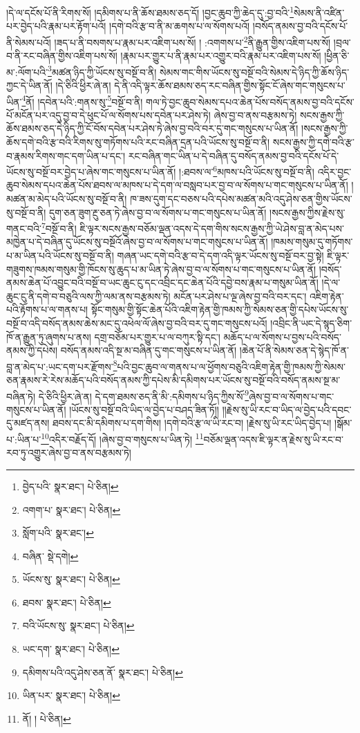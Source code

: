 །དེ་ལ་དངོས་པོ་ནི་རིགས་སོ། །དམིགས་པ་ནི་ཆོས་ཐམས་ཅད་དོ། །བྱང་ཆུབ་ཀྱི་ཆེད་དུ་:བྱ་བའི་\footnote{བྱེད་པའི་  སྣར་ཐང་།  པེ་ཅིན། }སེམས་ནི་འཛིན་པར་བྱེད་པའི་རྣམ་པར་རྟོག་པའོ། །དགེ་བའི་རྩ་བ་ནི་མ་ཆགས་པ་ལ་སོགས་པའོ། །བསོད་ནམས་བྱ་བའི་དངོས་པོ་ནི་སེམས་པའོ། །ཟད་པ་ནི་བསགས་པ་རྣམ་པར་འཇིག་པས་སོ། །
:འགགས་པ་\footnote{འགག་པ་  སྣར་ཐང་།  པེ་ཅིན། }ནི་རྒྱུན་གྱིས་འཇིག་པས་སོ། །བྲལ་བ་ནི་རང་བཞིན་གྱིས་འཇིག་པས་སོ། །རྣམ་པར་གྱུར་པ་ནི་རྣམ་པར་འགྱུར་བའི་རྣམ་པར་འཇིག་པས་སོ། །ཕྱིན་ཅི་མ་:ལོག་པའི་\footnote{སློག་པའི་  སྣར་ཐང་། }མཚན་ཉིད་ཀྱི་ཡོངས་སུ་བསྔོ་བ་ནི། སེམས་གང་གིས་ཡོངས་སུ་བསྔོ་བའི་སེམས་དེ་ཉིད་ཀྱི་ཆོས་ཉིད་ཀྱང་དེ་ཡིན་ནོ། །དེ་ཅིའི་ཕྱིར་ཞེ་ན། དེ་ནི་འདི་ལྟར་ཆོས་ཐམས་ཅད་རང་བཞིན་གྱིས་སྟོང་ངོ་ཞེས་གང་གསུངས་པ་ཡིན་\footnote{བཞིན་  སྡེ་དགེ། }ནོ། །དབེན་པའི་:གནས་སུ་\footnote{ཡོངས་སུ་  སྣར་ཐང་།  པེ་ཅིན། }བསྔོ་བ་ནི། གལ་ཏེ་བྱང་ཆུབ་སེམས་དཔའ་ཆེན་པོས་བསོད་ནམས་བྱ་བའི་དངོས་པོ་མངོན་པར་འདུ་བྱ་བ་དེ་ཕུང་པོ་ལ་སོགས་པས་དབེན་པར་ཤེས་ཏེ། ཞེས་བྱ་བ་ནས་བརྩམས་ཏེ། སངས་རྒྱས་ཀྱི་ཆོས་ཐམས་ཅད་དེ་ཉིད་ཀྱི་ངོ་བོས་དབེན་པར་ཤེས་ཏེ་ཞེས་བྱ་བའི་བར་དུ་གང་གསུངས་པ་ཡིན་ནོ། །སངས་རྒྱས་ཀྱི་ཆོས་དགེ་བའི་རྩ་བའི་རིགས་སུ་གཏོགས་པའི་རང་བཞིན་དྲན་པའི་ཡོངས་སུ་བསྔོ་བ་ནི། སངས་རྒྱས་ཀྱི་དགེ་བའི་རྩ་བ་རྣམས་རིགས་གང་དག་ཡིན་པ་དང་། རང་བཞིན་གང་ཡིན་པ་དེ་བཞིན་དུ་བསོད་ནམས་བྱ་བའི་དངོས་པོ་དེ་ཡོངས་སུ་བསྔོ་བར་བྱེད་པ་ཞེས་གང་གསུངས་པ་ཡིན་ནོ། །:ཐབས་ལ་\footnote{ཐབས་  སྣར་ཐང་།  པེ་ཅིན། }མཁས་པའི་ཡོངས་སུ་བསྔོ་བ་ནི། འདིར་བྱང་ཆུབ་སེམས་དཔའ་ཆེན་པོས་ཐབས་ལ་མཁས་པ་དེ་དག་ལ་བསླབ་པར་བྱ་བ་ལ་སོགས་པ་གང་གསུངས་པ་ཡིན་ནོ། །མཚན་མ་མེད་པའི་ཡོངས་སུ་བསྔོ་བ་ནི། ཁ་ཟས་དུག་དང་བཅས་པའི་དཔེས་མཚན་མའི་འདུ་ཤེས་ཅན་གྱིས་ཡོངས་སུ་བསྔོ་བ་ནི། དུག་ཅན་ཟུག་རྔུ་ཅན་ཏེ་ཞེས་བྱ་བ་ལ་སོགས་པ་གང་གསུངས་པ་ཡིན་ནོ། །སངས་རྒྱས་ཀྱིས་རྗེས་སུ་གནང་བའི་\footnote{བའི་ཡོངས་སུ་  སྣར་ཐང་།  པེ་ཅིན། }བསྔོ་བ་ནི། ཇི་ལྟར་སངས་རྒྱས་བཅོམ་ལྡན་འདས་དེ་དག་གིས་སངས་རྒྱས་ཀྱི་ཡེ་ཤེས་བླ་ན་མེད་པས་མཁྱེན་པ་དེ་བཞིན་དུ་ཡོངས་སུ་བསྔོའོ་ཞེས་བྱ་བ་ལ་སོགས་པ་གང་གསུངས་པ་ཡིན་ནོ། །ཁམས་གསུམ་དུ་གཏོགས་པ་མ་ཡིན་པའི་ཡོངས་སུ་བསྔོ་བ་ནི། གཞན་ཡང་དགེ་བའི་རྩ་བ་དེ་དག་འདི་ལྟར་ཡོངས་སུ་བསྔོ་བར་བྱ་སྟེ། ཇི་ལྟར་གཟུགས་ཁམས་གསུམ་གྱི་ཁོངས་སུ་ཆུད་པ་མ་ཡིན་ཏེ་ཞེས་བྱ་བ་ལ་སོགས་པ་གང་གསུངས་པ་ཡིན་ནོ། །བསོད་ནམས་ཆེན་པོ་འབྱུང་བའི་བསྔོ་བ་ཡང་ཆུང་ངུ་དང་འབྲིང་དང་ཆེན་པོའི་དབྱེ་བས་རྣམ་པ་གསུམ་ཡིན་ནོ། །དེ་ལ་ཆུང་ངུ་ནི་དགེ་བ་བཅུའི་ལས་ཀྱི་ལམ་ནས་བརྩམས་ཏེ། མངོན་པར་ཤེས་པ་ལྔ་ཞེས་བྱ་བའི་བར་དང་། འཇིག་རྟེན་པའི་རྟོགས་པ་ལ་གནས་པ། སྟོང་གསུམ་གྱི་སྟོང་ཆེན་པོའི་འཇིག་རྟེན་གྱི་ཁམས་ཀྱི་སེམས་ཅན་གྱི་དཔེས་ཡོངས་སུ་བསྔོ་བ་འདི་བསོད་ནམས་ཆེས་མང་དུ་འཕེལ་ལོ་ཞེས་བྱ་བའི་བར་དུ་གང་གསུངས་པའོ། །འབྲིང་ནི་ཡང་དེ་སྙད་ཅིག་ཁོ་ན་རྒྱུན་ཏུ་ཞུགས་པ་ནས། དགྲ་བཅོམ་པར་གྱུར་པ་ལ་བཀུར་སྟི་དང་། མཆོད་པ་ལ་སོགས་པ་བྱས་པའི་བསོད་ནམས་ཀྱི་དཔེས། བསོད་ནམས་འདི་སྔ་མ་བཞིན་དུ་གང་གསུངས་པ་ཡིན་ནོ། །ཆེན་པོ་ནི་སེམས་ཅན་དེ་སྙེད་ཁོ་ན་བླ་ན་མེད་པ་:ཡང་དག་པར་རྫོགས་\footnote{ཡང་དག་  སྣར་ཐང་།  པེ་ཅིན། }པའི་བྱང་ཆུབ་ལ་གནས་པ་ལ་ཕྱོགས་བཅུའི་འཇིག་རྟེན་གྱི་ཁམས་ཀྱི་སེམས་ཅན་རྣམས་རེ་རེས་མཆོད་པའི་བསོད་ནམས་ཀྱི་དཔེས་མི་དམིགས་པར་ཡོངས་སུ་བསྔོ་བའི་བསོད་ནམས་སྔ་མ་བཞིན་ཏེ། དེ་ཅིའི་ཕྱིར་ཞེ་ན། དེ་དག་ཐམས་ཅད་ནི་མི་:དམིགས་པ་ཉིད་ཀྱིས་སོ་\footnote{དམིགས་པའི་འདུ་ཤེས་ཅན་ནོ་  སྣར་ཐང་།  པེ་ཅིན། }ཞེས་བྱ་བ་ལ་སོགས་པ་གང་གསུངས་པ་ཡིན་ནོ། །ཡོངས་སུ་བསྔོ་བའི་ཡིད་ལ་བྱེད་པ་བཤད་ཟིན་ཏོ།། །།རྗེས་སུ་ཡི་རང་བ་ཡིད་ལ་བྱེད་པའི་དབང་དུ་མཛད་ནས། ཐབས་དང་མི་དམིགས་པ་དག་གིས། །དགེ་བའི་རྩ་ལ་ཡི་རང་བ། །རྗེས་སུ་ཡི་རང་ཡིད་བྱེད་པ། །སྒོམ་པ་:ཡིན་པ་\footnote{ཡིན་པར་  སྣར་ཐང་།  པེ་ཅིན། }འདིར་བརྗོད་དོ། །ཞེས་བྱ་བ་གསུངས་པ་ཡིན་ཏེ། \footnote{ནོ། །   པེ་ཅིན། }བཅོམ་ལྡན་འདས་ཇི་ལྟར་ན་རྗེས་སུ་ཡི་རང་བ་རབ་ཏུ་འགྱུར་ཞེས་བྱ་བ་ནས་བརྩམས་ཏེ། 